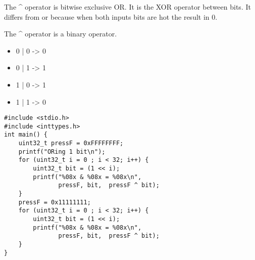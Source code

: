\documentclass[11pt]{article}
\begin{document}
The \^{} operator is bitwise exclusive OR. It is the XOR operator between
bits. It differs from or because when both inputs bits are hot the
result in 0.

The \^{} operator is a binary operator.

\begin{itemize}
\item 0 | 0 -> 0
\item 0 | 1 -> 1
\item 1 | 0 -> 1
\item 1 | 1 -> 0
\end{itemize}

\begin{verbatim}
#include <stdio.h>
#include <inttypes.h>
int main() {  
    uint32_t pressF = 0xFFFFFFFF;
    printf("ORing 1 bit\n");
    for (uint32_t i = 0 ; i < 32; i++) {
        uint32_t bit = (1 << i);
        printf("%08x & %08x = %08x\n",
               pressF, bit,  pressF ^ bit);
    }
    pressF = 0x11111111;
    for (uint32_t i = 0 ; i < 32; i++) {
        uint32_t bit = (1 << i);
        printf("%08x & %08x = %08x\n",
               pressF, bit,  pressF ^ bit);
    }
}
\end{verbatim}
\end{document}
